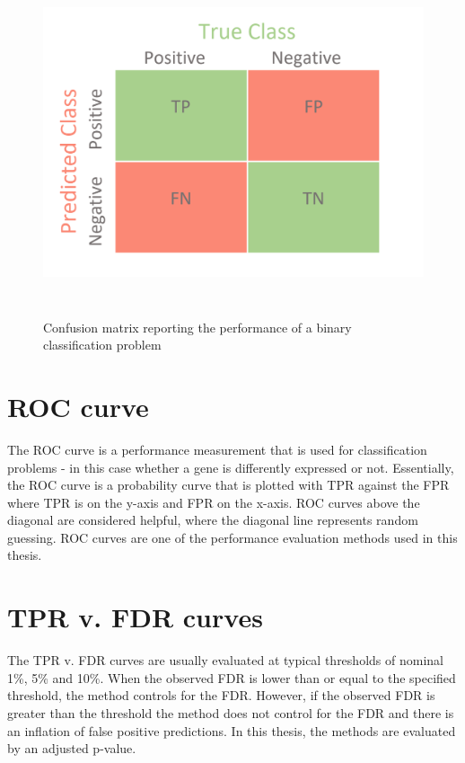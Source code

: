 \begin{figure}[!htb]
\begin{center}
\includegraphics[width=6in,height=4in]{figure/confusion_matrix.png}
\end{center}
\caption{Confusion matrix reporting the performance of a binary classification problem}
\label{fig:confusion_matrix}
\end{figure}
\FloatBarrier

\section{ROC curve}
The ROC curve is a performance measurement that is used for classification problems - in this case whether a gene is differently expressed or not. Essentially, the ROC curve is a probability curve that is plotted with TPR against the FPR where TPR is on the y-axis and FPR on the x-axis. ROC curves above the diagonal are considered helpful, where the diagonal line represents random guessing. ROC curves are one of the performance evaluation methods used in this thesis.

\section{TPR v. FDR curves}
The TPR v. FDR curves are usually evaluated at typical thresholds of nominal 1\%, 5\% and 10\%. When the observed FDR is lower than or equal to the specified threshold, the method controls for the FDR. However, if the observed FDR is greater than the threshold the method does not control for the FDR and there is an inflation of false positive predictions. In this thesis, the methods are evaluated by an adjusted p-value.

